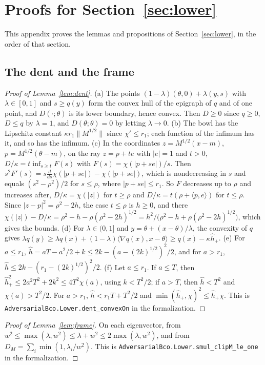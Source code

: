 \documentclass[11pt]{amsart}
\theoremstyle{definition}
\numberwithin{equation}{section}
\newcommand{\ip}[1]{\langle #1\rangle}
\begin{document}
\section{Proofs for Section~\ref{sec:lower}}\label{app:lowerproofs}

This appendix proves the lemmas and propositions of Section~\ref{sec:lower}, in the order of that section.

\subsection*{The dent and the frame}

\begin{proof}[Proof of Lemma~\ref{lem:dent}]
(a) The points $(1-\lambda)(\theta,0)+\lambda(y,s)$ with $\lambda\in[0,1]$ and $s\ge q(y)$ form the convex hull of the epigraph of $q$ and of one point, and $D(\cdot;\theta)$ is its lower boundary, hence convex. Then $D\ge0$ since $q\ge0$, $D\le q$ by $\lambda=1$, and $D(\theta;\theta)=0$ by letting $\lambda\to0$. (b) The bowl has the Lipschitz constant $\kappa r_1\|M^{1/2}\|$ since $\chi'\le r_1$; each function of the infimum has it, and so has the infimum. (c) In the coordinates $z=M^{1/2}(x-m)$, $p=M^{1/2}(\theta-m)$, on the ray $z=p+te$ with $|e|=1$ and $t>0$, $D/\kappa=t\inf_{s\ge t}F(s)$ with $F(s)=\chi(|p+se|)/s$. Then $s^2F'(s)=s\frac{d}{ds}\chi(|p+se|)-\chi(|p+se|)$, which is nondecreasing in $s$ and equals $(s^2-\rho^2)/2$ for $s\le\rho$, where $|p+se|\le r_1$. So $F$ decreases up to $\rho$ and increases after, $D/\kappa=\chi(|z|)$ for $t\ge\rho$ and $D/\kappa=t(\rho+\ip{p,e})$ for $t\le\rho$. Since $|z-p|^2=\rho^2-2h$, the case $t\le\rho$ is $h\ge0$, and there $\chi(|z|)-D/\kappa=\rho^2-h-\rho(\rho^2-2h)^{1/2}=h^2/\bigl(\rho^2-h+\rho(\rho^2-2h)^{1/2}\bigr)$, which gives the bounds. (d) For $\lambda\in(0,1]$ and $y=\theta+(x-\theta)/\lambda$, the convexity of $q$ gives $\lambda q(y)\ge\lambda q(x)+(1-\lambda)\ip{\nabla q(x),x-\theta}\ge q(x)-\kappa\hat h_+$. (e) For $a\le r_1$, $\hat h=aT-a^2/2+k\le2k-(a-(2k)^{1/2})^2/2$, and for $a>r_1$, $\hat h\le2k-(r_1-(2k)^{1/2})^2/2$. (f) Let $a\le r_1$. If $a\le T$, then $\hat h_+^2\le2a^2T^2+2k^2\le4T^2\chi(a)$, using $k<T^2/2$; if $a>T$, then $\hat h<T^2$ and $\chi(a)>T^2/2$. For $a>r_1$, $\hat h<r_1T+T^2/2$ and $\min(\hat h_+,\chi)^2\le\hat h_+\chi$.
This is \texttt{AdversarialBco.Lower.dent\_convexOn} in the formalization.
\end{proof}

\begin{proof}[Proof of Lemma~\ref{lem:frame}]
On each eigenvector, from $w^2\le\max(\lambda,w^2)\le\lambda+w^2\le2\max(\lambda,w^2)$, and from $D_M=\sum_i\min(1,\lambda_i/w^2)$.
This is \texttt{AdversarialBco.Lower.smul\_clipM\_le\_one} in the formalization.
\end{proof}
\end{document}
